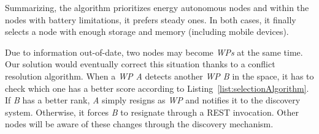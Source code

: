 Summarizing, the algorithm prioritizes energy autonomous nodes and within the nodes with battery limitations, it prefers steady ones.
In both cases, it finally selects a node with enough storage and memory (including mobile devices).


Due to information out-of-date, two nodes may become \emph{WPs} at the same time.
Our solution would eventually correct this situation thanks to a conflict resolution algorithm.
When a \emph{WP A} detects another \emph{WP B} in the space, it has to check which one has a better score according to Listing~\ref{list:selectionAlgorithm}.
If \emph{B} has a better rank, \emph{A} simply resigns as \emph{WP} and notifies it to the discovery system.
Otherwise, it forces \emph{B} to resignate through a REST invocation.
Other nodes will be aware of these changes through the discovery mechanism.







